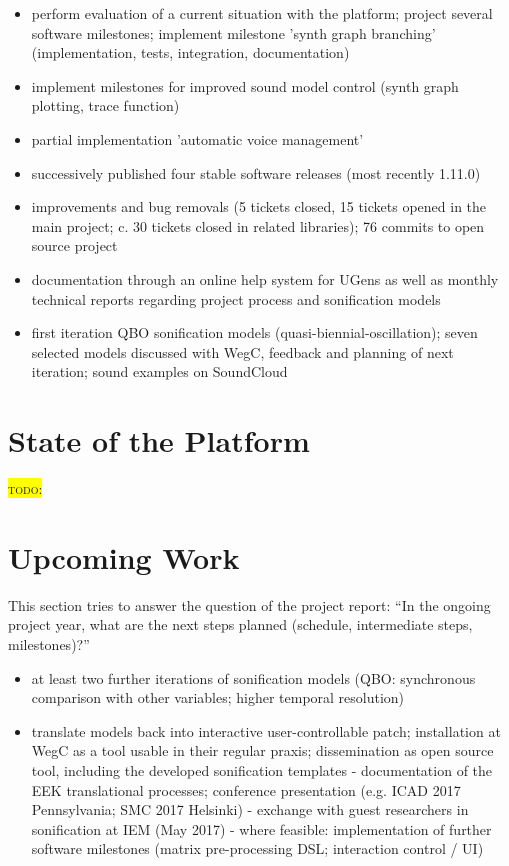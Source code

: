 \documentclass[11pt,a4paper]{article}
\newcommand{\todo}[1]{\colorbox{yellow}{\textsc{todo}: #1}}
\begin{document}
\begin{itemize}
\item perform evaluation of a current situation with the platform; project several software milestones; implement milestone 'synth graph branching' (implementation, tests, integration, documentation)
\item implement milestones for improved sound model control (synth graph plotting, trace function)
\item partial implementation 'automatic voice management'
\item successively published four stable software releases (most recently 1.11.0)
\item improvements and bug removals (5 tickets closed, 15 tickets opened in the main project; c. 30 tickets closed in related libraries); 76 commits to open source project
\item documentation through an online help system for UGens as well as monthly technical reports regarding project process and sonification models
\item first iteration QBO sonification models (quasi-biennial-oscillation); seven selected models discussed with WegC, feedback and planning of next iteration; sound examples on SoundCloud
\end{itemize}

\section{State of the Platform}

\todo{}

\section{Upcoming Work}

This section tries to answer the question of the project report: ``In the ongoing project year, what are the next steps planned (schedule, intermediate steps, milestones)?''

\begin{itemize}
\item at least two further iterations of sonification models (QBO: synchronous comparison with other variables; higher temporal resolution)
\item translate models back into interactive user-controllable patch; installation at WegC as a tool usable in their regular praxis; dissemination as open source tool, including the developed sonification templates
- documentation of the EEK translational processes; conference presentation (e.g. ICAD 2017 Pennsylvania; SMC 2017 Helsinki)
- exchange with guest researchers in sonification at IEM (May 2017)
- where feasible: implementation of further software milestones (matrix pre-processing DSL; interaction control / UI)
\end{itemize}
\end{document}
